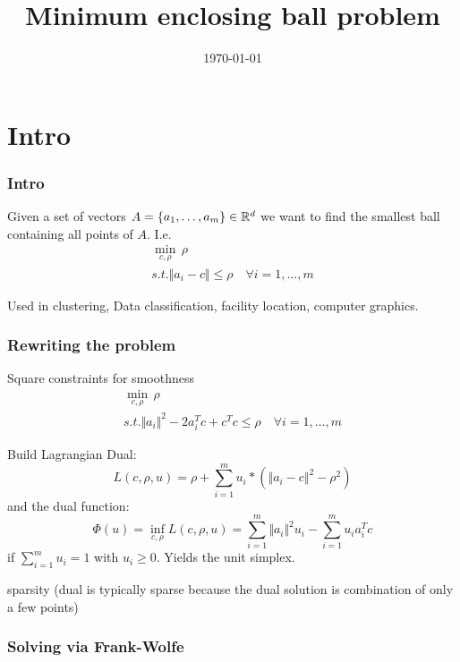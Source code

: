 \documentclass{beamer}
\title{Minimum enclosing ball problem}
\date{\today}
\begin{document}
\maketitle
\frame{\tableofcontents}

\section{Intro}

\begin{frame}
  \frametitle{Intro} %
  \begin{definition} %
    Given a set of vectors $A = \{a_1, \dots, a_m\}\in \mathbb{R}^d$ we want to find the smallest ball containing all points of $A$.
    I.e.
    \begin{align}
      \min_{c,\rho}\,  \rho \\
      s.t. \Vert a_i -c  \Vert \le \rho \quad \forall i=1, \dots, m
    \end{align}
  \end{definition}
  Used in clustering, Data classification, facility location, computer graphics.
\end{frame}

\begin{frame}
  \frametitle{Rewriting the problem}
  Square constraints for smoothness
    \begin{align}
      \min_{c,\rho} \, \rho \\
      s.t. \Vert a_i \Vert^2 - 2 a_i^T c + c^T c  \le \rho \quad \forall i=1, \dots, m
    \end{align}

    Build Lagrangian Dual:
    \begin{equation}
      L(c, \rho, u) = \rho + \sum_{i=1}^m u_i *  (\Vert a_i -c  \Vert^2- \rho^2)
    \end{equation}
    and the dual function:
    \begin{equation}
      \Phi(u) = \inf_{c, \rho} L(c, \rho, u) = \sum_{i=1}^m \Vert a_i \Vert^2u_i - \sum_{i=1}^{m} u_i a_i^T c
    \end{equation}
    if $\sum_{i=1}^{m} u_i = 1$ with $u_i \ge 0$. Yields the unit simplex.

    sparsity (dual is typically sparse because the dual solution is combination of only a few points)
\end{frame}

\begin{frame}
  \frametitle{Solving via Frank-Wolfe}

\end{frame}
\end{document}
